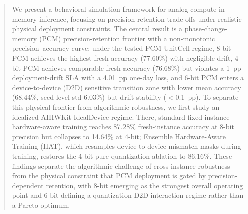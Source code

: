 \begin{abstract}
We present a behavioral simulation framework for analog compute-in-memory inference, focusing on precision-retention trade-offs under realistic physical deployment constraints. The central result is a phase-change-memory (PCM) precision-retention frontier with a non-monotonic precision--accuracy curve: under the tested PCM UnitCell regime, 8-bit PCM achieves the highest fresh accuracy (77.60\%) with negligible drift, 4-bit PCM achieves comparable fresh accuracy (76.68\%) but violates a 1~pp deployment-drift SLA with a 4.01~pp one-day loss, and 6-bit PCM enters a device-to-device (D2D) sensitive transition zone with lower mean accuracy (68.44\%, seed-level std 6.03\%) but drift stability ($<$0.1~pp). To separate this physical frontier from algorithmic robustness, we first study an idealized AIHWKit IdealDevice regime. There, standard fixed-instance hardware-aware training reaches 87.28\% fresh-instance accuracy at 8-bit precision but collapses to 14.64\% at 4-bit; Ensemble Hardware-Aware Training (HAT), which resamples device-to-device mismatch masks during training, restores the 4-bit pure-quantization ablation to 86.16\%. These findings separate the algorithmic challenge of cross-instance robustness from the physical constraint that PCM deployment is gated by precision-dependent retention, with 8-bit emerging as the strongest overall operating point and 6-bit defining a quantization-D2D interaction regime rather than a Pareto optimum.
\end{abstract}
